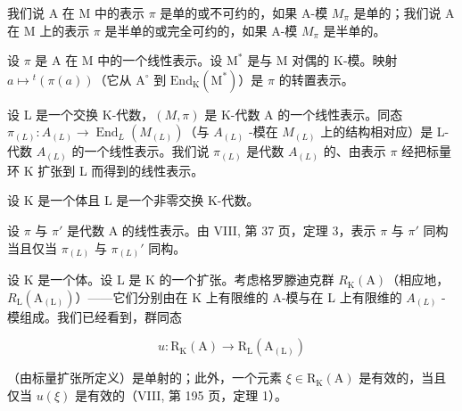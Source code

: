我们说 A 在 M 中的表示 \(\pi\) 是单的或不可约的，如果 A-模 \(M_{\pi}\) 是单的；我们说 A 在 M 上的表示 \(\pi\) 是半单的或完全可约的，如果 A-模 \(M_{\pi}\) 是半单的。

设 \(\pi\) 是 A 在 M 中的一个线性表示。设 \(\mathrm{M}^*\) 是与 M 对偶的 K-模。映射 \(a\mapsto{}^{t}(\pi (a))\)（它从 \(\mathrm{A}^{\circ}\) 到 \(\mathrm{End}_{\mathrm{K}}(\mathrm{M}^{*})\)）是 \(\pi\) 的转置表示。

设 L 是一个交换 K-代数，\((M,\pi)\) 是 K-代数 A 的一个线性表示。同态 \(\pi_{(L)}:A_{(L)}\to\operatorname{End}_{L}(M_{(L)})\)（与 \(A_{(L)}\) -模在 \(M_{(L)}\) 上的结构相对应）是 L-代数 \(A_{(L)}\) 的一个线性表示。我们说 \(\pi_{(L)}\) 是代数 \(A_{(L)}\) 的、由表示 \(\pi\) 经把标量环 K 扩张到 L 而得到的线性表示。

设 K 是一个体且 L 是一个非零交换 K-代数。

设 \(\pi\) 与 \(\pi'\) 是代数 A 的线性表示。由 VIII, 第 37 页，定理 3，表示 \(\pi\) 与 \(\pi'\) 同构当且仅当 \(\pi_{(L)}\) 与 \(\pi_{(L)}'\) 同构。

设 K 是一个体。设 L 是 K 的一个扩张。考虑格罗滕迪克群 \(R_{\mathrm{K}}(\mathrm{A})\)（相应地，\(R_{\mathrm{L}}(\mathrm{A}_{(\mathrm{L})})\)）——它们分别由在 K 上有限维的 A-模与在 L 上有限维的 \(A_{(L)}\) -模组成。我们已经看到，群同态

\[
u: \mathrm{R} _ {\mathrm{K}} (\mathrm{A}) \longrightarrow \mathrm{R} _ {\mathrm{L}} (\mathrm{A} _ {(\mathrm{L})})
\]

（由标量扩张所定义）是单射的；此外，一个元素 \(\xi \in \mathrm{R}_{\mathrm{K}}(\mathrm{A})\) 是有效的，当且仅当 \(u(\xi)\) 是有效的（VIII, 第 195 页，定理 1）。


